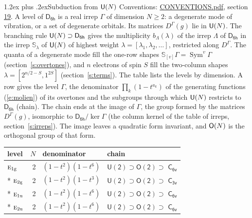 \documentclass[10pt,a4paper]{article}
\makeatletter
\renewcommand\section{\@startsection{section}{1}{\z@}{-3ex plus -1ex minus -.2ex}%
  {1.2ex plus .2ex}{\normalfont\large\sffamily\bfseries\color{parttitle}}}
\numberwithin{equation}{section}
\newcommand{\grp}[1]{\mathsf{#1}}
\newcommand{\irr}[1]{\text{\normalfont\scshape #1}}
\newcommand{\ptag}[1]{\mathrm{#1}}
\newcommand{\repD}[1]{D^{#1}}
\newcommand{\schur}[1]{\mathbb{S}_{#1}}
\newcommand{\shape}[1]{[#1]}
\makeatother
\begin{document}
\section{Subduction from \texorpdfstring{$\grp{U(\mathnormal{N})}$}{U(N)}}\label{s:unitary}
Conventions: \href{../../CONVENTIONS.pdf}{CONVENTIONS.pdf}, section \href{../../CONVENTIONS.pdf\#conv.19}{19}.
\leavevmode\label{n:local.level.dimension}A level of $\grp{D_{6h}}$ is a real irrep $\Gamma$ of dimension $N \ge 2$: a degenerate mode of vibration, or a set of degenerate orbitals. \label{n:group.unitary}Its matrices $\repD{\Gamma}(g)$ lie in $\grp{U(\mathnormal{N})}$. \label{n:irrep.schur}\label{n:shape.partition}\label{n:local.partition}\label{n:function.multiplicity.unitary}The branching rule $\grp{U(\mathnormal{N})} \supset \grp{D_{6h}}$ gives the multiplicity $b_\Lambda(\lambda)$ of the irrep $\Lambda$ of $\grp{D_{6h}}$ in the irrep $\schur{\lambda}$ of $\grp{U(\mathnormal{N})}$ of highest weight $\lambda = \shape{\lambda_1, \lambda_2, \dots}$, restricted along $\repD{\Gamma}$. \label{n:local.partition.power}\label{n:local.electrons}\label{n:local.spin}The quanta of a degenerate mode fill the one-row shapes $\schur{\shape{v}}\Gamma = \operatorname{Sym}^{v}\Gamma$ (section~\ref{s:overtones}), and $n$ electrons of spin $S$ fill the two-column shapes $\lambda = \shape{2^{n/2-S}, 1^{2S}}$ (section~\ref{s:terms}).
The table lists the levels by dimension. \label{n:head.level}\label{n:head.denominator}\label{n:index.overtone.denominator}\label{n:head.chain}A row gives the level $\Gamma$, the denominator $\prod_k (1 - t^{a_k})$ of the generating functions (\ref{e:molien}) of its overtones and the subgroups through which $\grp{U(\mathnormal{N})}$ restricts to $\grp{D_{6h}}$ (chain). The chain ends at the image of $\Gamma$, the group formed by the matrices $\repD{\Gamma}(g)$, isomorphic to $\grp{D_{6h}}/\ker\Gamma$ (the column kernel of the table of irreps, section~\ref{s:irreps}). The image leaves a quadratic form invariant, and $\grp{O(\mathnormal{N})}$ is the orthogonal group of that form.
{\small\begin{longtable}{@{}lrll@{}}\toprule
level & $N$ & denominator & chain\\\midrule\endhead
\bottomrule\endfoot\endlastfoot
$\irr{e}_{1\ptag{g}}$ & 2 & $(1-t^{2})(1-t^{6})$ & $\grp{U(2)} \supset \grp{O(2)} \supset$ \href{C6v.pdf}{$\grp{C_{6v}}$}\\*
$\irr{e}_{2\ptag{g}}$ & 2 & $(1-t^{2})(1-t^{3})$ & $\grp{U(2)} \supset \grp{O(2)} \supset$ \href{C3v.pdf}{$\grp{C_{3v}}$}\\*
$\irr{e}_{1\ptag{u}}$ & 2 & $(1-t^{2})(1-t^{6})$ & $\grp{U(2)} \supset \grp{O(2)} \supset$ \href{C6v.pdf}{$\grp{C_{6v}}$}\\*
$\irr{e}_{2\ptag{u}}$ & 2 & $(1-t^{2})(1-t^{6})$ & $\grp{U(2)} \supset \grp{O(2)} \supset$ \href{C6v.pdf}{$\grp{C_{6v}}$}\\
\bottomrule\end{longtable}}
\end{document}
